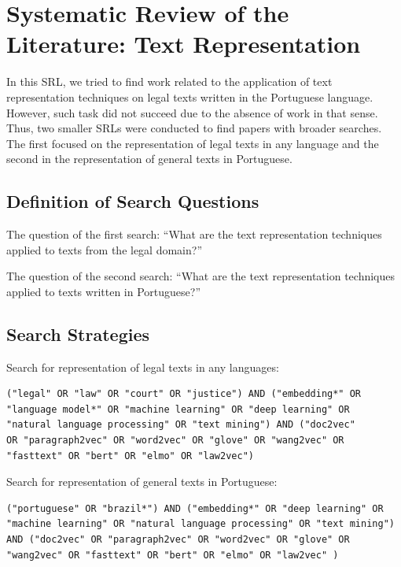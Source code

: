 \chapter{Systematic Review of the Literature: Text Representation}\label{ap:rsl_representation_law}



In this SRL, we tried to find work related to the application of text representation techniques on legal texts written in the Portuguese language. However, such task did not succeed due to the absence of work in that sense. Thus, two smaller SRLs were conducted to find papers with broader searches. The first focused on the representation of legal texts in any language and the second in the representation of general texts in Portuguese. 

\section{Definition of Search Questions}

The question of the first search: ``What are the text representation techniques applied to texts from the legal domain?''

The question of the second search: ``What are the text representation techniques applied to texts written in Portuguese?''

\section{Search Strategies}

Search for representation of legal texts in any languages:

\begin{verbatim}
("legal" OR "law" OR "court" OR "justice") AND ("embedding*" OR 
"language model*" OR "machine learning" OR "deep learning" OR 
"natural language processing" OR "text mining") AND ("doc2vec" 
OR "paragraph2vec" OR "word2vec" OR "glove" OR "wang2vec" OR 
"fasttext" OR "bert" OR "elmo" OR "law2vec")
\end{verbatim}


Search for representation of general texts in Portuguese:

\begin{verbatim}
("portuguese" OR "brazil*") AND ("embedding*" OR "deep learning" OR 
"machine learning" OR "natural language processing" OR "text mining") 
AND ("doc2vec" OR "paragraph2vec" OR "word2vec" OR "glove" OR 
"wang2vec" OR "fasttext" OR "bert" OR "elmo" OR "law2vec" ) 
\end{verbatim}



